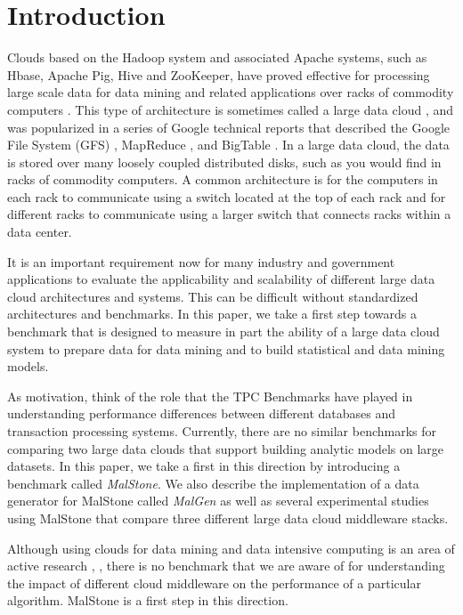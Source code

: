 \documentclass{acm_proc_article-sp}
\def\malstone{MalStone } \def\malgen{MalGen }
\def\malstonens{MalStone} \def\malgenns{MalGen}
\begin{document}
\section{Introduction}

Clouds based on the Hadoop system and associated Apache systems, such
as Hbase, Apache Pig, Hive and ZooKeeper, have proved effective for
processing large scale data for data mining and related applications
over racks of commodity computers \cite{Hadoop:2010}. This type of
architecture is sometimes called a large data cloud
\cite{Grossman:BDE09}, and was popularized in a series of Google
technical reports that described the Google File System (GFS)
\cite{Ghemawat:2003}, MapReduce \cite{Dean:2004}, and BigTable
\cite{Chang:2006}. In a large data cloud, the data is stored over many
loosely coupled distributed disks, such as you would find in racks of
commodity computers. A common architecture is for the computers in
each rack to communicate using a switch located at the top of each
rack and for different racks to communicate using a larger switch that
connects racks within a data center.

It is an important requirement now for many industry and government
applications to evaluate the applicability and scalability of
different large data cloud architectures and systems. This can be
difficult without standardized architectures and benchmarks. In this
paper, we take a first step towards a benchmark that is designed to
measure in part the ability of a large data cloud system to prepare
data for data mining and to build statistical and data mining models.

As motivation, think of the role that the TPC Benchmarks have played
in understanding performance differences between different databases
and transaction processing systems. Currently, there are no similar
benchmarks for comparing two large data clouds that support building
analytic models on large datasets. In this paper, we take a first in
this direction by introducing a benchmark called {\em \malstonens}. We
also describe the implementation of a data generator for \malstone
called {\em \malgen} as well as several experimental studies using
\malstone that compare three different large data cloud middleware
stacks.

Although using clouds for data mining and data intensive computing is
an area of active research \cite{Dean:2008}, \cite{Chu:2007}, there is
no benchmark that we are aware of for understanding the impact of
different cloud middleware on the performance of a particular
algorithm. \malstone is a first step in this direction.
\end{document}

